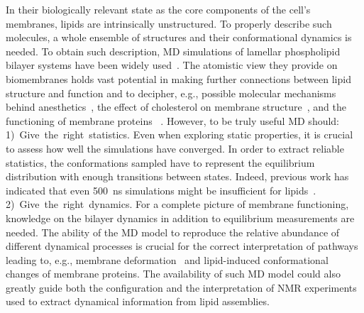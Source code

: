 \documentclass[journal=jpcbfk,manuscript=article,layout=twocolumn]{achemso}
\begin{document}
In their biologically relevant state as the core components of the cell's membranes, lipids are intrinsically unstructured.
To properly describe such molecules, a whole ensemble of structures and their conformational dynamics is needed.
To obtain such description, MD simulations of lamellar phospholipid bilayer systems have been widely 
used~\cite{lyubartsev11,chau07,ferreira13,botan15, ferreira15,miettinen19,XXX}.
The atomistic view they provide on biomembranes holds vast potential in making further connections between lipid structure and function and to decipher, e.g.,  possible molecular mechanisms behind anesthetics~\cite{chau07,XXX}, the effect of cholesterol on membrane structure~\cite{XXX,ferreira13}, and the functioning of membrane proteins~\cite{lindahl08} .
However, to be truly useful MD should:
%
\mbox{1) Give the right statistics.}
Even when exploring static properties, it is crucial to assess how well the simulations have converged. In order to extract reliable statistics, the conformations sampled have to represent the equilibrium distribution with enough transitions between states. Indeed, previous work has indicated that even 500~ns simulations might be insufficient for lipids~\cite{vogel12,ferreira15}.
%
\mbox{2) Give the right dynamics.}
For a complete picture of membrane functioning, knowledge on the bilayer dynamics in addition to equilibrium measurements are needed. The ability of the MD model to reproduce the relative abundance of different dynamical processes is crucial for the correct interpretation of pathways leading to, e.g., membrane deformation~\cite{chernomordik08} and lipid-induced conformational~\cite{gibson93,phillips09} changes of membrane proteins. The availability of such MD model could also greatly guide both the configuration and the interpretation of NMR experiments used to extract dynamical information from lipid assemblies.
\end{document}

